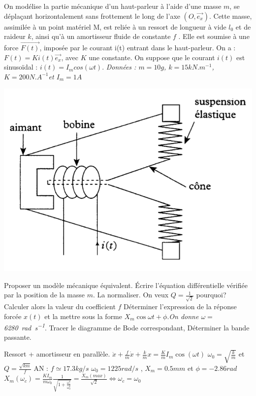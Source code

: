 \begin{Exercise}[title=Modélisation d'un haut-parleur]
		\begin{minipage}{.6\linewidth}
			On modélise la partie mécanique d’un haut-parleur à
			l’aide d’une masse $m$, se déplaçant horizontalement
			sans frottement le long de l’axe $(O,\vec{e_x})$. Cette masse,
            assimilée à un point matériel M, est reliée à un ressort de longueur
            à vide $l_0$ et de raideur $k$, ainsi qu’à un amortisseur fluide de
            constante $f$ . Elle est soumise	à une force $\vec{F(t)}$,
            imposée par le courant i(t) entrant dans le haut-parleur.
            On a : $F(t) = K i(t)\vec{e_x}$, avec $K$ une constante.
			On suppose que le courant $i(t)$ est sinusoïdal : $i(t) =
			I_m cos(\omega t)$.
			\emph{Données : $m= 10g$, $k= 15kN.m^{-1}$, $K=200N.A^{-1}$et $I_m=1A$}
		\end{minipage}\hspace*{0.05\linewidth}\begin{minipage}{.3\linewidth}
\includegraphics[width=\textwidth]{../fig/haut-parleur}
		\end{minipage}
	\Question Proposer un modèle mécanique équivalent.
	\Question Écrire l'équation différentielle vérifiée par la position de la masse $m$.
	\Question La normaliser. On veux $Q= \frac{1}{\sqrt{2}}$ pourquoi? Calculer alors la valeur du coefficient $f$
	\Question Déterminer  l'expression de la réponse forcée $x(t)$ et la mettre sous la forme $X_m \cos{\omega t+ \phi}$.\emph{On donne $\omega =$\SI{6280}{rad\per\s}}.
	\Question Tracer le diagramme de Bode correspondant, Déterminer la bande passante.
\end{Exercise}
\begin{Answer}
	\Question Ressort + amortisseur en parallèle.
	\Question $\ddot{x}+\frac{f}{m}\dot{x}+\frac{k}{m}x = \frac{K}{m}I_m \cos(\omega t)$
	\Question $\omega_0 = \sqrt{\frac{k}{m}}$ et $Q= \frac{\sqrt{km}}{f}$ AN : $f \simeq 17.3kg/s$
	\Question $\omega_0 = 1225 rad/s $ , $X_m=0.5 mm$ et $\phi = -2.86 rad$
	\Question $X_m(\omega_c) = \frac{KI_m}{m\omega_0}\frac{1}{\sqrt{1+\frac{\omega_c^4}{\omega_0^4}}}=\frac{X_m(max)}{\sqrt{2}} \Leftrightarrow  \omega_c =\omega_0$
\end{Answer}
